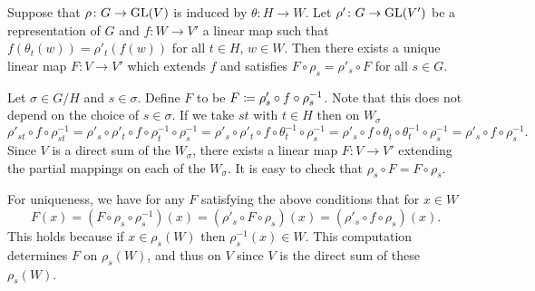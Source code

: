 \documentclass[letterpaper, 11pt, oneside]{book}
\begin{document}
\begin{lem}\label{lem:induced_reps_unique_lin}
  Suppose that $\rho\colon G \to \operatorname{GL}(V)$ is induced by $\theta\colon H \to W$.
  Let $\rho'\colon G \to \operatorname{GL}(V')$ be a representation of $G$ and $f\colon W \to V'$ a linear map such that $f(\theta_{t}(w)) = \rho'_{t}(f(w))$ for all $t \in H$, $w \in W$.
  Then there exists a unique linear map $F\colon V \to V'$ which extends $f$ and satisfies $F \circ \rho_{s} = \rho'_{s} \circ F$ for all $s \in G$.
\end{lem}
\begin{pf}
  Let $\sigma \in G / H$ and $s \in \sigma$.
  Define $F$ to be $F \coloneqq \rho'_{s} \circ f \circ \rho_{s}^{-1}$.
  Note that this does not depend on the choice of $s \in \sigma$.
  If we take $st$ with $t \in H$ then on $W_{\sigma}$
  \[
    \rho'_{st} \circ f \circ \rho^{-1}_{st} = \rho'_{s} \circ \rho'_{t} \circ f \circ \rho^{-1}_{t} \circ \rho^{-1}_{s} = \rho'_{s} \circ \rho'_{t} \circ f \circ \theta^{-1}_{t} \circ \rho^{-1}_{s} = \rho'_{s} \circ f \circ \theta_{t} \circ \theta^{-1}_{t} \circ \rho^{-1}_{s} = \rho'_{s} \circ f \circ \rho^{-1}_{s}.
  \]
  Since $V$ is a direct sum of the $W_{\sigma}$, there exists a linear map $F\colon V \to V'$ extending the partial mappings on each of the $W_{\sigma}$.
  It is easy to check that $\rho_{s} \circ F = F \circ \rho_{s}$.

  For uniqueness, we have for any $F$ satisfying the above conditions that for $x \in W$
  \[
    F(x) = (F \circ \rho_{s} \circ \rho_{s}^{-1})(x) = (\rho'_{s} \circ F \circ \rho_{s})(x) = (\rho'_{s} \circ f \circ \rho_{s})(x).
  \]
  This holds because if $x \in \rho_{s}(W)$ then $\rho^{-1}_{s}(x) \in W$.
  This computation determines $F$ on $\rho_{s}(W)$, and thus on $V$ since $V$ is the direct sum of these $\rho_{s}(W)$.
\end{pf}
\end{document}
